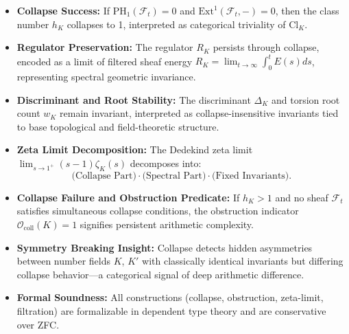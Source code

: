 \documentclass[11pt]{article}
\begin{document}
\begin{itemize}
  \item \textbf{Collapse Success:}  
  If \( \mathrm{PH}_1(\mathcal{F}_t) = 0 \) and \( \mathrm{Ext}^1(\mathcal{F}_t, -) = 0 \),  
  then the class number \( h_K \) collapses to 1, interpreted as categorical triviality of \( \mathrm{Cl}_K \).
  
  \item \textbf{Regulator Preservation:}  
  The regulator \( R_K \) persists through collapse, encoded as a limit of filtered sheaf energy  
  \( R_K = \lim_{t \to \infty} \int_0^t E(s) ds \), representing spectral geometric invariance.
  
  \item \textbf{Discriminant and Root Stability:}  
  The discriminant \( \Delta_K \) and torsion root count \( w_K \) remain invariant,  
  interpreted as collapse-insensitive invariants tied to base topological and field-theoretic structure.

  \item \textbf{Zeta Limit Decomposition:}  
  The Dedekind zeta limit \( \lim_{s \to 1^+} (s - 1)\zeta_K(s) \) decomposes into:  
  \[
  \text{(Collapse Part)} \cdot \text{(Spectral Part)} \cdot \text{(Fixed Invariants)}.
  \]

  \item \textbf{Collapse Failure and Obstruction Predicate:}  
  If \( h_K > 1 \) and no sheaf \( \mathcal{F}_t \) satisfies simultaneous collapse conditions,  
  the obstruction indicator \( \mathcal{O}_{\mathrm{coll}}(K) = 1 \) signifies persistent arithmetic complexity.

  \item \textbf{Symmetry Breaking Insight:}  
  Collapse detects hidden asymmetries between number fields \( K \), \( K' \) with classically identical invariants  
  but differing collapse behavior—a categorical signal of deep arithmetic difference.

  \item \textbf{Formal Soundness:}  
  All constructions (collapse, obstruction, zeta-limit, filtration) are formalizable in  
  dependent type theory and are conservative over ZFC.
\end{itemize}



\end{document}
